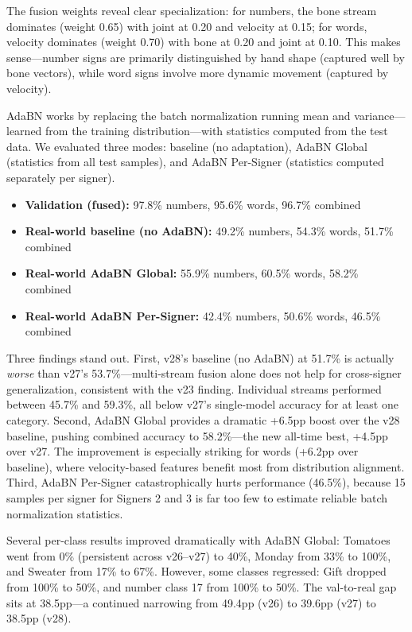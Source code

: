 \documentclass[conference]{IEEEtran}
\begin{document}
The fusion weights reveal clear specialization: for numbers, the bone stream dominates (weight 0.65) with joint at 0.20 and velocity at 0.15; for words, velocity dominates (weight 0.70) with bone at 0.20 and joint at 0.10. This makes sense---number signs are primarily distinguished by hand shape (captured well by bone vectors), while word signs involve more dynamic movement (captured by velocity).

AdaBN works by replacing the batch normalization running mean and variance---learned from the training distribution---with statistics computed from the test data. We evaluated three modes: baseline (no adaptation), AdaBN Global (statistics from all test samples), and AdaBN Per-Signer (statistics computed separately per signer).

\begin{itemize}
    \item \textbf{Validation (fused):} 97.8\% numbers, 95.6\% words, 96.7\% combined
    \item \textbf{Real-world baseline (no AdaBN):} 49.2\% numbers, 54.3\% words, 51.7\% combined
    \item \textbf{Real-world AdaBN Global:} 55.9\% numbers, 60.5\% words, 58.2\% combined
    \item \textbf{Real-world AdaBN Per-Signer:} 42.4\% numbers, 50.6\% words, 46.5\% combined
\end{itemize}

Three findings stand out. First, v28's baseline (no AdaBN) at 51.7\% is actually \textit{worse} than v27's 53.7\%---multi-stream fusion alone does not help for cross-signer generalization, consistent with the v23 finding. Individual streams performed between 45.7\% and 59.3\%, all below v27's single-model accuracy for at least one category. Second, AdaBN Global provides a dramatic +6.5pp boost over the v28 baseline, pushing combined accuracy to 58.2\%---the new all-time best, +4.5pp over v27. The improvement is especially striking for words (+6.2pp over baseline), where velocity-based features benefit most from distribution alignment. Third, AdaBN Per-Signer catastrophically hurts performance (46.5\%), because 15 samples per signer for Signers 2 and 3 is far too few to estimate reliable batch normalization statistics.

Several per-class results improved dramatically with AdaBN Global: Tomatoes went from 0\% (persistent across v26--v27) to 40\%, Monday from 33\% to 100\%, and Sweater from 17\% to 67\%. However, some classes regressed: Gift dropped from 100\% to 50\%, and number class 17 from 100\% to 50\%. The val-to-real gap sits at 38.5pp---a continued narrowing from 49.4pp (v26) to 39.6pp (v27) to 38.5pp (v28).
\end{document}
